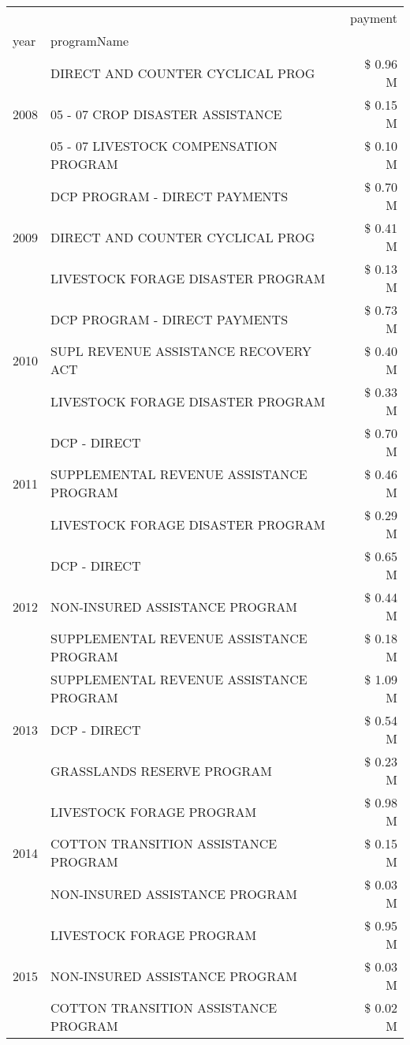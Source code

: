 \begin{tabular}{llr}
\toprule
 &  & payment \\
year & programName &  \\
\midrule
\multirow[t]{3}{*}{2008} & DIRECT AND COUNTER CYCLICAL PROG & \$ 0.96 M \\
 & 05 - 07 CROP DISASTER ASSISTANCE & \$ 0.15 M \\
 & 05 - 07 LIVESTOCK COMPENSATION PROGRAM & \$ 0.10 M \\
\cline{1-3}
\multirow[t]{3}{*}{2009} & DCP PROGRAM - DIRECT PAYMENTS & \$ 0.70 M \\
 & DIRECT AND COUNTER CYCLICAL PROG & \$ 0.41 M \\
 & LIVESTOCK FORAGE DISASTER  PROGRAM & \$ 0.13 M \\
\cline{1-3}
\multirow[t]{3}{*}{2010} & DCP PROGRAM - DIRECT PAYMENTS & \$ 0.73 M \\
 & SUPL REVENUE ASSISTANCE RECOVERY ACT & \$ 0.40 M \\
 & LIVESTOCK FORAGE DISASTER  PROGRAM & \$ 0.33 M \\
\cline{1-3}
\multirow[t]{3}{*}{2011} & DCP - DIRECT & \$ 0.70 M \\
 & SUPPLEMENTAL REVENUE ASSISTANCE PROGRAM & \$ 0.46 M \\
 & LIVESTOCK FORAGE DISASTER PROGRAM & \$ 0.29 M \\
\cline{1-3}
\multirow[t]{3}{*}{2012} & DCP - DIRECT & \$ 0.65 M \\
 & NON-INSURED ASSISTANCE PROGRAM & \$ 0.44 M \\
 & SUPPLEMENTAL REVENUE ASSISTANCE PROGRAM & \$ 0.18 M \\
\cline{1-3}
\multirow[t]{3}{*}{2013} & SUPPLEMENTAL REVENUE ASSISTANCE PROGRAM & \$ 1.09 M \\
 & DCP - DIRECT & \$ 0.54 M \\
 & GRASSLANDS RESERVE PROGRAM & \$ 0.23 M \\
\cline{1-3}
\multirow[t]{3}{*}{2014} & LIVESTOCK FORAGE PROGRAM & \$ 0.98 M \\
 & COTTON TRANSITION ASSISTANCE PROGRAM & \$ 0.15 M \\
 & NON-INSURED ASSISTANCE PROGRAM & \$ 0.03 M \\
\cline{1-3}
\multirow[t]{3}{*}{2015} & LIVESTOCK FORAGE PROGRAM & \$ 0.95 M \\
 & NON-INSURED ASSISTANCE PROGRAM & \$ 0.03 M \\
 & COTTON TRANSITION ASSISTANCE PROGRAM & \$ 0.02 M \\

\end{tabular}
